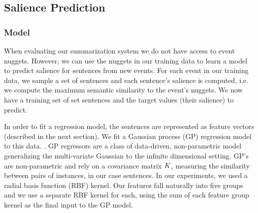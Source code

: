 %

\subsection{Salience Prediction}
\label{sec:salpred}

\subsubsection{Model}

When evaluating our summarization system
we do not have access to event nuggets. However, we can use the nuggets
in our training data to learn a model to predict salience for sentences
from new events.
For each event in our training data, we sample a set of sentences and  each 
sentence's salience is computed, i.e. we compute the maximum semantic 
similarity to the event's nuggets.
We now have a training set of set sentences and the target values 
(their salience) to predict.

In order to fit a regression model, the sentences are represented as feature
vectors (described in the next section).
We fit a Gaussian process (GP) regression model to this data.
\cite{rasmussen:gaussian-process-book}.  GP regressors are a
class of data-driven, non-parametric model generalizing the multi-variate
Gaussian to the infinite dimensional setting.  
GP's are non-parametric and rely on a covariance matrix $K$, measuring the similarity between pairs of instances, in our 
case sentences.  In our experiments, we used a radial basis 
function (RBF) kernel.  
Our features fall naturally into five groups and we use a separate RBF kernel
for each, using the sum of each feature group kernel as the final input
to the GP model.

